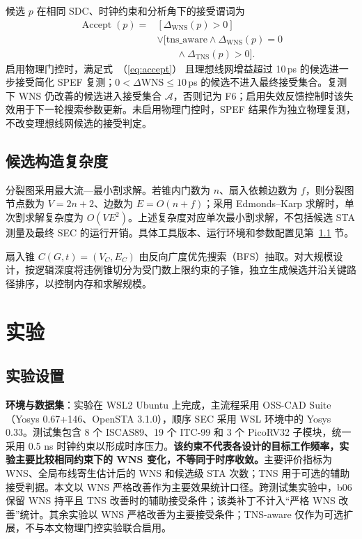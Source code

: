 \documentclass[twocolumn,10pt,fontset=windows]{ctexart}
\renewcommand{\eqref}[1]{\textup{（\ref{#1}）}}
\begin{document}
候选 $p$ 在相同 SDC、时钟约束和分析角下的接受谓词为
\begin{equation}
\label{eq:accept}
\begin{aligned}
\operatorname{Accept}(p)={}&[\Delta_{\mathrm{WNS}}(p)>0]\\
&\lor[\mathrm{tns\_aware}\land\Delta_{\mathrm{WNS}}(p)=0\\
&\qquad\land\Delta_{\mathrm{TNS}}(p)>0].
\end{aligned}
\end{equation}
启用物理门控时，满足式~\eqref{eq:accept} 且理想线网增益超过 10\,ps 的候选进一步接受简化 SPEF 复测；$0<\Delta\mathrm{WNS}\le10\,$ps 的候选不进入最终接受集合。复测下 WNS 仍改善的候选进入接受集合 $\mathcal{A}$，否则记为 F6；启用失效反馈控制时该失效用于下一轮搜索参数更新。未启用物理门控时，SPEF 结果作为独立物理复测，不改变理想线网候选的接受判定。

\subsection{候选构造复杂度}\label{sec:impl}

分裂图采用最大流—最小割求解。若锥内门数为 $n$、扇入依赖边数为 $f$，则分裂图节点数为 $V=2n+2$、边数为 $E=O(n+f)$；采用 Edmonds--Karp 求解时，单次割求解复杂度为 $O(VE^2)$。上述复杂度对应单次最小割求解，不包括候选 STA 测量及最终 SEC 的运行开销。具体工具版本、运行环境和参数配置见第~\ref{sec:setup} 节。

扇入锥 $C(G, t) = (V_C, E_C)$ 由反向广度优先搜索（BFS）抽取。对大规模设计，按逻辑深度将违例锥切分为受门数上限约束的子锥，独立生成候选并沿关键路径排序，以控制内存和求解规模。

\section{实验}\label{sec:exp}

\subsection{实验设置}\label{sec:setup}

\textbf{环境与数据集}：实验在 WSL2 Ubuntu 上完成，主流程采用 OSS-CAD Suite（Yosys 0.67+146、OpenSTA 3.1.0），顺序 SEC 采用 WSL 环境中的 Yosys 0.33。测试集包含 8 个 ISCAS89、19 个 ITC-99 和 3 个 PicoRV32 子模块，统一采用 0.5 ns 时钟约束以形成时序压力。\textbf{该约束不代表各设计的目标工作频率，实验主要比较相同约束下的 WNS 变化，不等同于时序收敛。}主要评价指标为 WNS、全局布线寄生估计后的 WNS 和候选级 STA 次数；TNS 用于可选的辅助接受判据。本文以 WNS 严格改善作为主要效果统计口径。跨测试集实验中，b06 保留 WNS 持平且 TNS 改善时的辅助接受条件；该类补丁不计入“严格 WNS 改善”统计。其余实验以 WNS 严格改善为主要接受条件；TNS-aware 仅作为可选扩展，不与本文物理门控实验联合启用。
\end{document}
